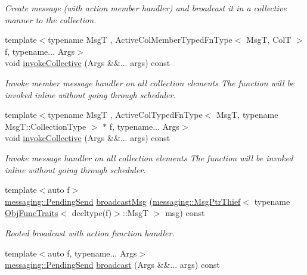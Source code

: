 \begin{DoxyCompactItemize}
\begin{DoxyCompactList}\small\item\em Create message (with action member handler) and broadcast it in a collective manner to the collection. \end{DoxyCompactList}\item 
{\footnotesize template$<$typename MsgT , Active\+Col\+Member\+Typed\+Fn\+Type$<$ Msg\+T, Col\+T $>$ f, typename... Args$>$ }\\void \hyperlink{structvt_1_1vrt_1_1collection_1_1_broadcastable_a3acc97a928f8d184e54d696e49377008}{invoke\+Collective} (Args \&\&... args) const
\begin{DoxyCompactList}\small\item\em Invoke member message handler on all collection elements The function will be invoked inline without going through scheduler. \end{DoxyCompactList}\item 
{\footnotesize template$<$typename MsgT , Active\+Col\+Typed\+Fn\+Type$<$ Msg\+T, typename Msg\+T\+::\+Collection\+Type $>$ $\ast$ f, typename... Args$>$ }\\void \hyperlink{structvt_1_1vrt_1_1collection_1_1_broadcastable_a3acc97a928f8d184e54d696e49377008}{invoke\+Collective} (Args \&\&... args) const
\begin{DoxyCompactList}\small\item\em Invoke message handler on all collection elements The function will be invoked inline without going through scheduler. \end{DoxyCompactList}\item 
{\footnotesize template$<$auto f$>$ }\\\hyperlink{structvt_1_1messaging_1_1_pending_send}{messaging\+::\+Pending\+Send} \hyperlink{structvt_1_1vrt_1_1collection_1_1_broadcastable_a9b50dd4776a129f168366e07af536160}{broadcast\+Msg} (\hyperlink{structvt_1_1messaging_1_1_msg_ptr_thief}{messaging\+::\+Msg\+Ptr\+Thief}$<$ typename \hyperlink{structvt_1_1_obj_func_traits}{Obj\+Func\+Traits}$<$ decltype(f)$>$\+::MsgT $>$ msg) const
\begin{DoxyCompactList}\small\item\em Rooted broadcast with action function handler. \end{DoxyCompactList}\item 
{\footnotesize template$<$auto f, typename... Args$>$ }\\\hyperlink{structvt_1_1messaging_1_1_pending_send}{messaging\+::\+Pending\+Send} \hyperlink{structvt_1_1vrt_1_1collection_1_1_broadcastable_af8df39dc496fd4caffd029a714369610}{broadcast} (Args \&\&... args) const

\end{DoxyCompactItemize}

